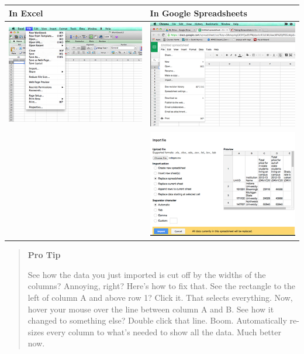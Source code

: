 \documentclass[
]{book}
\begin{document}
\begin{longtable}[]{@{}ll@{}}
\toprule
In Excel & In Google Spreadsheets \\
\midrule
\endhead
\includegraphics{images/excelmean3.png} & \includegraphics{images/googlemean3.png} \\
& \includegraphics{images/googlemean4.png} \\
\bottomrule
\end{longtable}

\begin{quote}
\textbf{Pro Tip}

See how the data you just imported is cut off by the widths of the columns? Annoying, right? Here's how to fix that. See the rectangle to the left of column A and above row 1? Click it. That selects everything. Now, hover your mouse over the line between column A and B. See how it changed to something else? Double click that line. Boom. Automatically re-sizes every column to what's needed to show all the data. Much better now.
\end{quote}
\end{document}

